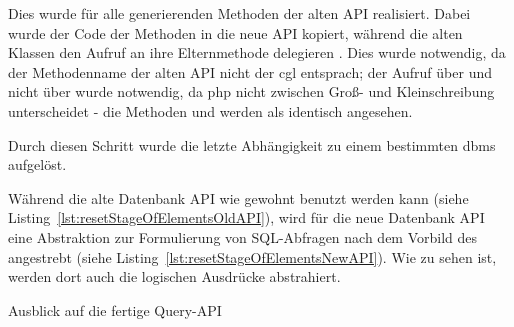 Dies wurde für alle generierenden Methoden der alten API realisiert. Dabei wurde der Code der Methoden in die neue API kopiert, während die alten Klassen den Aufruf an ihre Elternmethode delegieren . Dies wurde notwendig, da der Methodenname der alten API nicht der \gls{cgl} entsprach; der Aufruf über  und nicht über  wurde notwendig, da \gls{php} nicht zwischen Groß- und Kleinschreibung unterscheidet - die Methoden  und  werden als identisch angesehen.

Durch diesen Schritt wurde die letzte Abhängigkeit zu einem bestimmten \gls{dbms} aufgelöst.

Während die alte Datenbank API wie gewohnt benutzt werden kann (siehe Listing~\ref{lst:resetStageOfElementsOldAPI}), wird für die neue Datenbank API eine Abstraktion zur Formulierung von SQL-Abfragen nach dem Vorbild des  angestrebt (siehe Listing~\ref{lst:resetStageOfElementsNewAPI}). Wie zu sehen ist, werden dort auch die logischen Ausdrücke abstrahiert.

\begin{listing}[H]
\caption{}
\label{lst:resetStageOfElementsOldAPI}
\end{listing}

\begin{listing}[H]
\caption{Ausblick auf die fertige Query-API}
\label{lst:resetStageOfElementsNewAPI}
\end{listing}

